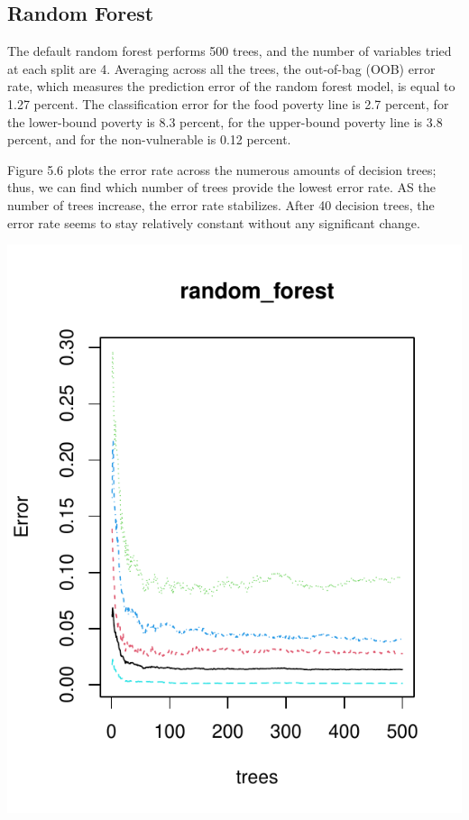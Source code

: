 \documentclass[11pt,preprint, authoryear]{elsarticle}
\let\origfigure\figure
\let\endorigfigure\endfigure
\renewenvironment{figure}[1][2] {
    \expandafter\origfigure\expandafter[H]
} {
    \endorigfigure
}
\numberwithin{equation}{section}
\numberwithin{figure}{section}
\numberwithin{table}{section}
\begin{document}
\hypertarget{random-forest-1}{%
\subsection{Random Forest}\label{random-forest-1}}

The default random forest performs 500 trees, and the number of
variables tried at each split are 4. Averaging across all the trees, the
out-of-bag (OOB) error rate, which measures the prediction error of the
random forest model, is equal to 1.27 percent. The classification error
for the food poverty line is 2.7 percent, for the lower-bound poverty is
8.3 percent, for the upper-bound poverty line is 3.8 percent, and for
the non-vulnerable is 0.12 percent.

Figure 5.6 plots the error rate across the numerous amounts of decision
trees; thus, we can find which number of trees provide the lowest error
rate. AS the number of trees increase, the error rate stabilizes. After
40 decision trees, the error rate seems to stay relatively constant
without any significant change.

\begin{figure}[H]

{\centering \includegraphics{Predicting-Poverty_files/figure-latex/Figure9-1} 

}

\caption{Mean square error of forest\label{Figure9}}\label{fig:Figure9}
\end{figure}
\end{document}
